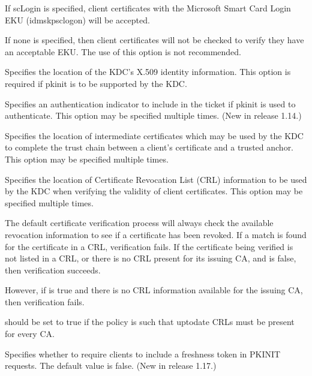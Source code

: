 \documentclass[letterpaper,10pt,english]{sphinxmanual}
\begin{document}
\begin{description}
\begin{description}
\sphinxAtStartPar
If scLogin is specified, client certificates with the
Microsoft Smart Card Login EKU (id\sphinxhyphen{}ms\sphinxhyphen{}kp\sphinxhyphen{}sc\sphinxhyphen{}logon) will be
accepted.

\sphinxAtStartPar
If none is specified, then client certificates will not be
checked to verify they have an acceptable EKU.  The use of
this option is not recommended.

\end{description}

\sphinxAtStartPar
Specifies the location of the KDC’s X.509 identity information.
This option is required if pkinit is to be supported by the KDC.

\sphinxAtStartPar
Specifies an authentication indicator to include in the ticket if
pkinit is used to authenticate.  This option may be specified
multiple times.  (New in release 1.14.)

\sphinxAtStartPar
Specifies the location of intermediate certificates which may be
used by the KDC to complete the trust chain between a client’s
certificate and a trusted anchor.  This option may be specified
multiple times.

\sphinxAtStartPar
Specifies the location of Certificate Revocation List (CRL)
information to be used by the KDC when verifying the validity of
client certificates.  This option may be specified multiple times.

\sphinxAtStartPar
The default certificate verification process will always check the
available revocation information to see if a certificate has been
revoked.  If a match is found for the certificate in a CRL,
verification fails.  If the certificate being verified is not
listed in a CRL, or there is no CRL present for its issuing CA,
and  is false, then verification
succeeds.

\sphinxAtStartPar
However, if  is true and there is
no CRL information available for the issuing CA, then verification
fails.

\sphinxAtStartPar
{} should be set to true if the
policy is such that up\sphinxhyphen{}to\sphinxhyphen{}date CRLs must be present for every CA.

\sphinxAtStartPar
Specifies whether to require clients to include a freshness token
in PKINIT requests.  The default value is false.  (New in release
1.17.)

\end{description}
\end{document}

